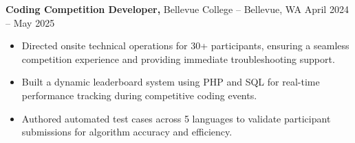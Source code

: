 \documentclass[11pt]{article}       %
\begin{document}

\textbf{Coding Competition Developer,} {Bellevue College} -- Bellevue, WA \hfill April 2024 -- May 2025 \\
\vspace{-9pt}
\begin{itemize}
  \item Directed onsite technical operations for 30+ participants, ensuring a seamless competition experience and providing immediate troubleshooting support.
  \item Built a dynamic leaderboard system using PHP and SQL for real-time performance tracking during competitive coding events.
  \item Authored automated test cases across 5 languages to validate participant submissions for algorithm accuracy and efficiency.
\end{itemize}

\end{document}
